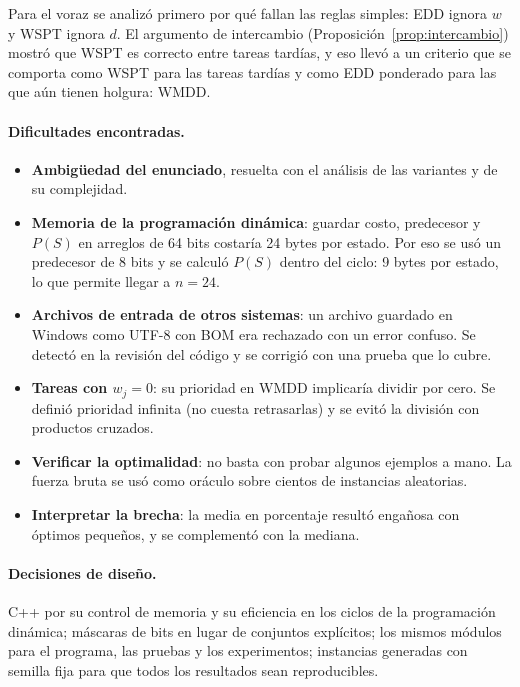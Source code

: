 \documentclass[10pt,twocolumn,letterpaper]{article}
\begin{document}
Para el voraz se analizó primero por qué fallan las reglas simples: EDD
ignora $w$ y WSPT ignora $d$. El argumento de intercambio
(Proposición~\ref{prop:intercambio}) mostró que WSPT es correcto entre tareas
tardías, y eso llevó a un criterio que se comporta como WSPT para las tareas
tardías y como EDD ponderado para las que aún tienen holgura: WMDD.

\paragraph{Dificultades encontradas.}
\begin{itemize}
  \item \textbf{Ambigüedad del enunciado}, resuelta con el análisis de las
        variantes y de su complejidad.
  \item \textbf{Memoria de la programación dinámica}: guardar costo,
        predecesor y $P(S)$ en arreglos de 64 bits costaría 24 bytes por
        estado. Por eso se usó un predecesor de 8 bits y se calculó $P(S)$
        dentro del ciclo: 9 bytes por estado, lo que permite llegar a $n=24$.
  \item \textbf{Archivos de entrada de otros sistemas}: un archivo guardado
        en Windows como UTF-8 con BOM era rechazado con un error confuso. Se
        detectó en la revisión del código y se corrigió con una prueba que lo
        cubre.
  \item \textbf{Tareas con $w_j=0$}: su prioridad en WMDD implicaría dividir
        por cero. Se definió prioridad infinita (no cuesta retrasarlas) y se
        evitó la división con productos cruzados.
  \item \textbf{Verificar la optimalidad}: no basta con probar algunos ejemplos
        a mano. La fuerza bruta se usó como oráculo sobre cientos de instancias
        aleatorias.
  \item \textbf{Interpretar la brecha}: la media en porcentaje resultó
        engañosa con óptimos pequeños, y se complementó con la mediana.
\end{itemize}

\paragraph{Decisiones de diseño.} C++ por su control de memoria y su
eficiencia en los ciclos de la programación dinámica; máscaras de bits en lugar
de conjuntos explícitos; los mismos módulos para el programa, las pruebas y
los experimentos; instancias generadas con semilla fija para que todos los
resultados sean reproducibles.
\end{document}
